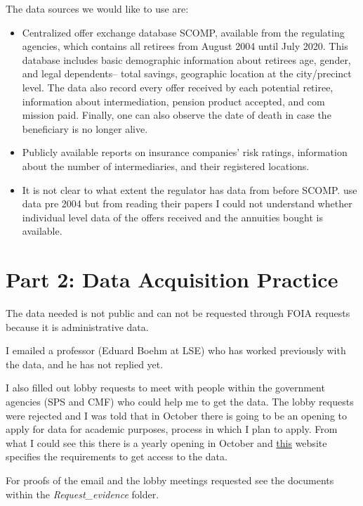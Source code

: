 \documentclass[12pt]{article}
\theoremstyle{plain}
\theoremstyle{plain}
\begin{document}
The data sources we would like to use are: 
\begin{itemize}
    \item Centralized offer exchange database SCOMP, available from the regulating agencies, which contains all retirees from August 2004 until July
 2020. This database includes basic demographic information about retirees age, gender, and legal dependents– total savings, geographic location at the
 city/precinct level. The data also record every offer received by each potential retiree, information about intermediation, pension product accepted, and com
mission paid. Finally, one can also observe the date of death in case the beneficiary is no longer alive. 

    \item Publicly available reports on insurance
    companies’ risk ratings, information about the number of intermediaries, and  their registered locations.

    \item It is not clear to what extent the regulator has data from before SCOMP.   \textcite{james_pensiones_2005, halcartegaray_efectos_2011, morales_chilean_2017} use data pre 2004 but from reading their papers I could not understand whether individual level data of the offers received and the annuities bought is available.
\end{itemize}
 


 \section{ Part 2: Data Acquisition Practice}

The data needed is not public and can not be requested through FOIA requests because it is administrative data. 

I emailed  a professor (Eduard Boehm at LSE) who has worked previously with the data, and he has not replied yet. 

I also filled out lobby requests to meet with people within the government agencies (SPS and CMF) who could help me to get the data. The lobby requests were rejected and I was told that in October there is going to be an opening to apply for data for academic purposes, process in which I plan to apply. From what I could see this there is a yearly opening in October and \href{https://cmfchile.cl/portal/prensa/615/w3-article-86338.html}{this} website specifies the requirements to get access to the data. 

For proofs of the email and the lobby meetings requested see the documents within the \textit{Request\_evidence} folder.
 
\end{document}

